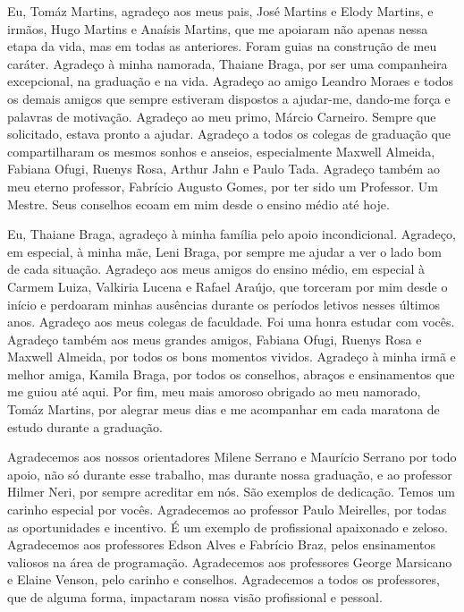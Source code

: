 \begin{agradecimentos}
Eu, Tomáz Martins, agradeço aos meus pais, José Martins e Elody Martins, e irmãos,
Hugo Martins e Anaísis Martins, que me apoiaram não apenas nessa etapa da vida,
mas em todas as anteriores. Foram guias na construção de meu caráter. Agradeço
à minha namorada, Thaiane Braga, por ser uma companheira excepcional, na graduação
e na vida. Agradeço ao amigo Leandro Moraes e todos os demais amigos que sempre
estiveram dispostos a ajudar-me, dando-me força e palavras de motivação. Agradeço
ao meu primo, Márcio Carneiro. Sempre que solicitado, estava pronto a ajudar.
Agradeço a todos os colegas de graduação que compartilharam os mesmos sonhos e
anseios, especialmente Maxwell Almeida, Fabiana Ofugi, Ruenys Rosa, Arthur Jahn
e Paulo Tada. Agradeço também ao meu eterno professor, Fabrício Augusto Gomes,
por ter sido um Professor. Um Mestre. Seus conselhos ecoam em mim desde o ensino
médio até hoje.

Eu, Thaiane Braga, agradeço à minha família pelo apoio incondicional. Agradeço,
em especial, à minha mãe, Leni Braga, por sempre me ajudar a ver o lado bom de
cada situação. Agradeço aos meus amigos do ensino médio, em especial à Carmem Luiza,
Valkiria Lucena e Rafael Araújo, que torceram por mim desde o início e perdoaram
minhas ausências durante os períodos letivos nesses últimos anos. Agradeço aos meus
colegas de faculdade. Foi uma honra estudar com vocês. Agradeço também aos meus
grandes amigos, Fabiana Ofugi, Ruenys Rosa e Maxwell Almeida, por todos os bons
momentos vividos.  Agradeço à minha irmã e melhor amiga, Kamila Braga, por todos
os conselhos, abraços e ensinamentos que me guiou até aqui. Por fim, meu mais
amoroso obrigado ao meu namorado, Tomáz Martins, por alegrar meus dias e me
acompanhar em cada maratona de estudo durante a graduação.

Agradecemos aos nossos orientadores Milene Serrano e Maurício Serrano por todo
apoio, não só durante esse trabalho, mas durante nossa graduação, e ao professor
Hilmer Neri, por sempre acreditar em nós. São exemplos de dedicação. Temos um
carinho especial por vocês. Agradecemos ao professor Paulo Meirelles, por todas
as oportunidades e incentivo. É um exemplo de profissional apaixonado e zeloso.
Agradecemos aos professores Edson Alves e Fabrício Braz, pelos ensinamentos valiosos
na área de programação. Agradecemos aos professores George Marsicano e Elaine Venson,
pelo carinho e conselhos. Agradecemos a todos os professores, que de alguma forma,
impactaram nossa visão profissional e pessoal.
\end{agradecimentos}
